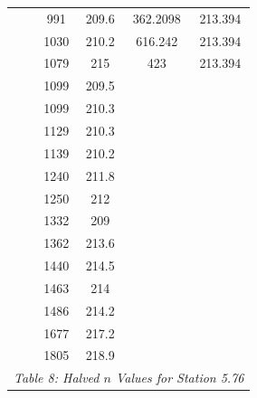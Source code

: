 \begin{center}
\begin{tabular}{|cc||cc||cc|}
             &                           & 991  & 209.6                          & 362.2098 & 213.394                             \\
             &                           & 1030 & 210.2                          & 616.242  & 213.394                             \\
             &                           & 1079 & 215                            & 423      & 213.394                             \\
             &                           & 1099 & 209.5                          &          &                                     \\
             &                           & 1099 & 210.3                          &          &                                     \\
             &                           & 1129 & 210.3                          &          &                                     \\
             &                           & 1139 & 210.2                          &          &                                     \\
             &                           & 1240 & 211.8                          &          &                                     \\
             &                           & 1250 & 212                            &          &                                     \\
             &                           & 1332 & 209                            &          &                                     \\
             &                           & 1362 & 213.6                          &          &                                     \\
             &                           & 1440 & 214.5                          &          &                                     \\
             &                           & 1463 & 214                            &          &                                     \\
             &                           & 1486 & 214.2                          &          &                                     \\
             &                           & 1677 & 217.2                          &          &                                     \\
             &                           & 1805 & 218.9                          &          &                                     \\
    \hline\multicolumn{6}{c}{\emph{Table 8: Halved $n$ Values for Station 5.76}}
\end{tabular}


\end{center}
